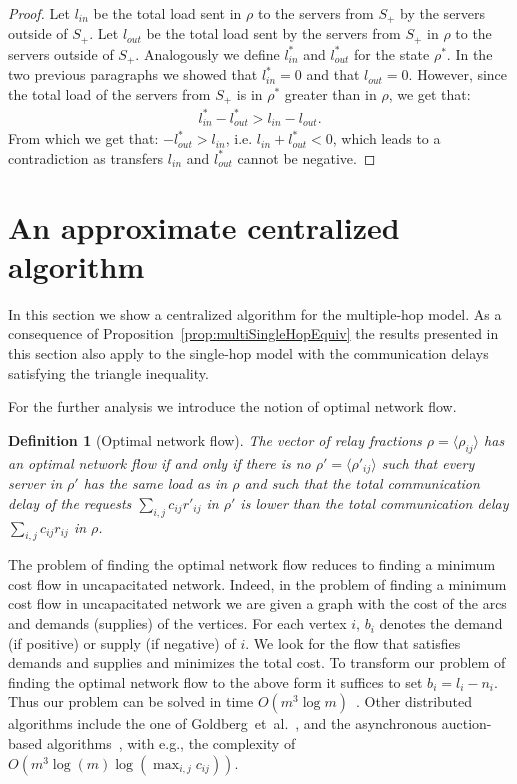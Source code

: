 \documentclass[11pt]{article}
\newtheorem{definition}{Definition}
\begin{document}
\begin{proof}
Let $l_{in}$ be the total load sent in $\rho$ to the servers from $S_{+}$ by the servers outside of $S_{+}$. Let $l_{out}$ be the total load sent by the servers from $S_{+}$ in $\rho$ to the servers outside of $S_{+}$. Analogously we define $l^{*}_{in}$ and $l^{*}_{out}$ for the state $\rho^{*}$. In the two previous paragraphs we showed that $l^{*}_{in} = 0$ and that $l_{out} = 0$. However, since the total load of the servers from $S_{+}$ is in $\rho^{*}$ greater than in $\rho$, we get that:
\begin{align*}
l^{*}_{in} - l^{*}_{out} > l_{in} - l_{out} \textrm{.}
\end{align*}
From which we get that: $-l^{*}_{out} > l_{in}$, i.e. $l_{in} + l^*_{out} < 0$, which leads to a contradiction as transfers $l_{in}$ and $l^*_{out}$ cannot be negative.
\end{proof}


\section{An approximate centralized algorithm}\label{sec:approximate-centralized}

In this section we show a centralized algorithm for the multiple-hop model. As a consequence of Proposition~\ref{prop:multiSingleHopEquiv} the results presented in this section also apply to the single-hop model with the communication delays satisfying the triangle inequality.

For the further analysis we introduce the notion of optimal network flow.

\begin{definition}[Optimal network flow]
The vector of relay fractions $\rho = \langle \rho_{ij} \rangle$ has an optimal network flow if and only if there is no $\rho' = \langle \rho'_{ij} \rangle$ such that every server in $\rho'$ has the same load as in $\rho$ and such that the total communication delay of the requests $\sum_{i, j}c_{ij}r'_{ij}$ in $\rho'$ is lower than the total communication delay $\sum_{i, j}c_{ij}r_{ij}$ in $\rho$.
\end{definition} 

The problem of finding the optimal network flow reduces to finding a minimum cost flow in uncapacitated network.
Indeed, in the problem of finding a minimum cost flow in uncapacitated network we are given a graph with the cost of the arcs and demands (supplies) of the vertices. For each vertex $i$, $b_i$ denotes the demand (if positive) or supply (if negative) of $i$. We look for the flow that satisfies demands and supplies and minimizes the total cost. To transform our problem of finding the optimal network flow to the above form it suffices to set $b_{i} = l_i - n_i$. 
Thus our problem can be solved in time $O(m^3\log m)$~\cite{Orlin88afaster}. Other distributed algorithms include the one of Goldberg~et~al.~\cite{minimumCirculation}, and the asynchronous auction-based algorithms~\cite{auctionBasedMinCostFlow}, with e.g., the complexity of $O(m^3\log (m)\log (\max_{i,j}c_{ij}))$.
\end{document}
